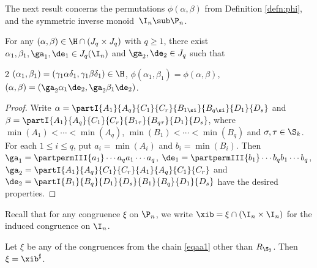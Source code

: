 The next result concerns the permutations $\phi(\alpha,\beta)$ from Definition \ref{defn:phi}, and the symmetric inverse monoid~$\I_n\sub\P_n$.

%
\begin{lemma}
\label{lemma-aa1a}
For any $(\alpha,\beta)\in {\H}\cap (J_q\times J_q)$ with $q\geq 1$, there exist $\alpha_1,\beta_1,\ga_1,\de_1\in J_q(\I_n)$ and $\ga_2,\de_2\in J_q$ such that~
\begin{itemize}
\begin{multicols}2
 $(\alpha_1,\beta_1)=(\gamma_1\alpha\delta_1,\gamma_1\beta\delta_1) \in{\H}$,
 $\phi(\alpha_1,\beta_1)=\phi(\alpha,\beta)$, 
 $(\alpha,\beta)=(\ga_2\alpha_1\de_2,\ga_2\beta_1\de_2)$.
\end{multicols}\end{itemize}
\end{lemma}

\begin{proof}
Write
$\alpha=\partI{A_1}{A_q}{C_1}{C_r}{B_{1\si}}{B_{q\si}}{D_1}{D_s}$
and
$\beta=\partI{A_1}{A_q}{C_1}{C_r}{B_{1\tau}}{B_{q\tau}}{D_1}{D_s}$, where $\min(A_1)<\cdots<\min(A_q)$, $\min(B_1)<\cdots<\min(B_q)$ and $\sigma,\tau\in\S_k$.  For each $1\leq i\leq q$, put $a_i=\min(A_i)$ and $b_i=\min(B_i)$.  Then $\ga_1=\partpermIII{a_1}\cdots{a_q}{a_1}\cdots{a_q}$, $\de_1=\partpermIII{b_1}\cdots{b_q}{b_1}\cdots{b_q}$, $\ga_2=\partI{A_1}{A_q}{C_1}{C_r}{A_1}{A_q}{C_1}{C_r}$ and $\de_2=\partI{B_1}{B_q}{D_1}{D_s}{B_1}{B_q}{D_1}{D_s}$
have the desired properties. \end{proof}


Recall that for any congruence $\xi$ on $\P_n$, we write $\xib=\xi\cap (\I_n\times\I_n)$ for the induced congruence on $\I_n$.



\begin{lemma}
\label{lemma-aa2}
Let $\xi$ be any of the congruences from the chain \eqref{eqaa1} other than $R_{\S_2}$.  Then $\xi=\xib^\sharp$.

\end{lemma}


